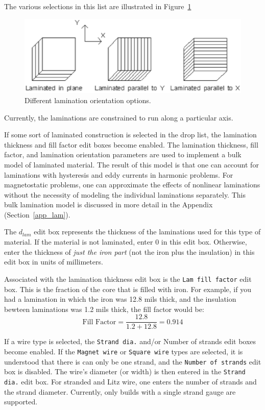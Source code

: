 \documentclass[12pt]{report}
\begin{document}
The various selections in this list are illustrated
in Figure~\ref{lamdir}
\begin{figure}[ht]
\centerline{\includegraphics{lamscheme.ps}}
\caption{Different lamination orientation options.}
\label{lamdir}
\end{figure}
Currently, the laminations are constrained to run along a
particular axis.

If some sort of laminated construction is selected in the drop list,
the lamination thickness and fill factor edit boxes become enabled.
The lamination thickness, fill factor, and lamination orientation
parameters are used to implement a bulk model of laminated
material.  The result of this model is that one can account for
laminations with hysteresis and eddy currents in harmonic problems.
For magnetostatic problems, one can approximate the effects of
nonlinear laminations without the necessity of modeling the
individual laminations separately. This bulk lamination model is
discussed in more detail in the Appendix (Section~\ref{app_lam}).

The $d_{lam}$ edit box represents the thickness of the
laminations used for this type of material.  If the material is not
laminated, enter 0 in this edit box.  Otherwise, enter the
thickness of {\em just the iron part} (not the iron plus the
insulation) in this edit box in units of millimeters.

Associated with the lamination thickness edit box is the {\tt Lam
fill factor} edit box.  This is the fraction of the core that is
filled with iron.  For example, if you had a lamination in which
the iron was 12.8 mils thick, and the insulation bewteen
laminations was 1.2 mils thick, the fill factor would be:
\begin{displaymath}
\mbox{Fill Factor} = \frac{12.8}{1.2+12.8} = 0.914
\end{displaymath}

If a wire type is selected, the {\tt Strand dia.} and/or {Number of strands}
edit boxes become enabled.  If the {\tt Magnet wire} or {\tt Square wire} types
are selected, it is understood that there is can only be one strand, and the
{\tt Number of strands} edit box is disabled.  The wire's diameter (or width)
is then entered in the {\tt Strand dia.} edit box.  For stranded and Litz wire,
one enters the number of strands and the strand diameter.  Currently, only builds
with a single strand gauge are supported.
\end{document}

